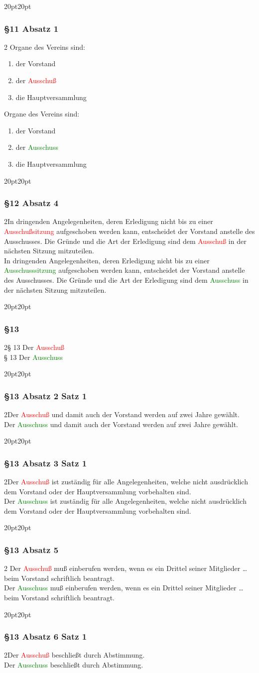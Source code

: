 \documentclass[10pt,a4paper,parskip=half]{scrartcl}
\newcommand{\new}[1]{\textcolor{Green}{#1}}
\newcommand{\old}[1]{\textcolor{Red}{#1}}
\newcommand{\change}[1]{
  \begin{adjustwidth}{20pt}{20pt}
    #1
  \end{adjustwidth}
}
\newcommand{\compare}[3]{\change{\subsubsection*{#1}\begin{multicols}{2}#2\columnbreak\\#3\end{multicols}}}
\begin{document}
  \change{
  \subsubsection*{§11 Absatz 1}\begin{multicols}{2}
    Organe des Vereins sind:
    \begin{enumerate}[noitemsep]
      \item der Vorstand
      \item der \old{Ausschuß}
      \item die Hauptversammlung
    \end{enumerate}
    \columnbreak
    Organe des Vereins sind:
    \begin{enumerate}[noitemsep]
      \item der Vorstand
      \item der \new{Ausschuss}
      \item die Hauptversammlung
    \end{enumerate}
    \end{multicols}
  }

  \clearpage
  \compare{§12 Absatz 4}
  {In dringenden Angelegenheiten,
    deren Erledigung nicht bis zu einer \old{Ausschußsitzung} aufgeschoben werden kann,
    entscheidet der Vorstand anstelle des Ausschusses.
    Die Gründe und die Art der Erledigung sind dem \old{Ausschuß} in der nächsten Sitzung mitzuteilen.
  }{
    In dringenden Angelegenheiten,
    deren Erledigung nicht bis zu einer \new{Ausschusssitzung} aufgeschoben werden kann,
    entscheidet der Vorstand anstelle des Ausschusses.
    Die Gründe und die Art der Erledigung sind dem \new{Ausschuss} in der nächsten Sitzung mitzuteilen.
  }

  \compare{§13}
  {§ 13 Der \old{Ausschuß}}
  {§ 13 Der \new{Ausschuss}}

  \compare{§13 Absatz 2 Satz 1}
  {Der \old{Ausschuß} und damit auch der Vorstand werden auf zwei Jahre gewählt.}
  {Der \new{Ausschuss} und damit auch der Vorstand werden auf zwei Jahre gewählt.}

  \compare{§13 Absatz 3 Satz 1}
  {Der \old{Ausschuß} ist zuständig für alle Angelegenheiten, welche nicht ausdrücklich dem Vorstand oder der Hauptversammlung vorbehalten sind.}
  {Der \new{Ausschuss} ist zuständig für alle Angelegenheiten, welche nicht ausdrücklich dem Vorstand oder der Hauptversammlung vorbehalten sind.}

  \compare{§13 Absatz 5}{    
  Der \old{Ausschuß} muß einberufen werden,
    wenn es ein Drittel seiner Mitglieder \dots beim Vorstand schriftlich beantragt.
  }
  {Der \new{Ausschuss} muß einberufen werden,
  wenn es ein Drittel seiner Mitglieder \dots beim Vorstand schriftlich beantragt.}
  \compare{§13 Absatz 6 Satz 1}
  {Der \old{Ausschuß} beschließt durch Abstimmung.}
  {Der \new{Ausschuss} beschließt durch Abstimmung.}
\end{document}
